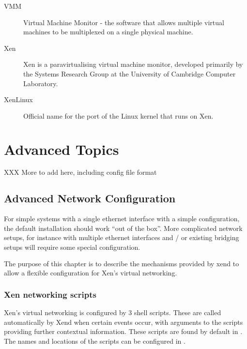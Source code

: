 \documentclass[11pt,twoside,final,openright]{xenstyle}
\begin{document}
{\begin{description}
\item[VMM]                 Virtual Machine Monitor - the software that
                           allows multiple virtual machines to be
                           multiplexed on a single physical machine.

\item[Xen]                 Xen is a paravirtualising virtual machine
                           monitor, developed primarily by the
                           Systems Research Group at the University
                           of Cambridge Computer Laboratory.

\item[XenLinux]            Official name for the port of the Linux kernel
                           that runs on Xen.

\end{description}

\part{Advanced Topics}

XXX More to add here, including config file format

\chapter{Advanced Network Configuration}

For simple systems with a single ethernet interface with a simple
configuration, the default installation should work ``out of the
box''.  More complicated network setups, for instance with multiple
ethernet interfaces and / or existing bridging setups will require
some special configuration.

The purpose of this chapter is to describe the mechanisms provided by
xend to allow a flexible configuration for Xen's virtual networking.

\section{Xen networking scripts}

Xen's virtual networking is configured by 3 shell scripts.  These are
called automatically by Xend when certain events occur, with arguments
to the scripts providing further contextual information.  These
scripts are found by default in .  The names and
locations of the scripts can be configured in .

}
\end{document}

